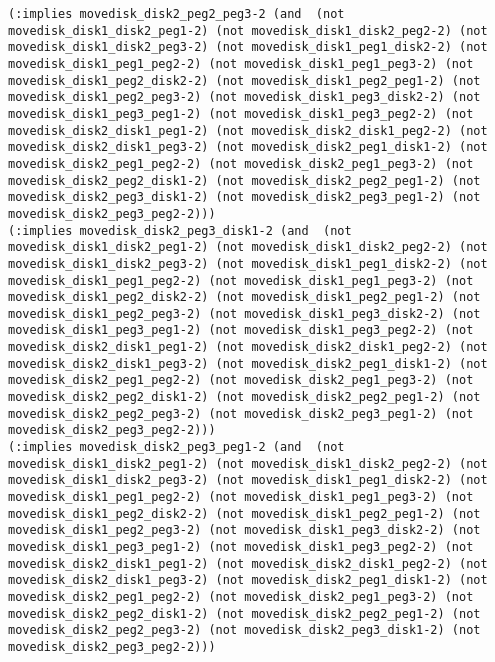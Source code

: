 \documentclass[12pt,letterpaper]{ntdhw}
\begin{document}
\begin{enumerate}
\begin{enumerate}
\begin{lstlisting}[language=pddl, style=pddlstyle,
  basicstyle=\scriptsize]
(:implies movedisk_disk2_peg2_peg3-2 (and  (not movedisk_disk1_disk2_peg1-2) (not movedisk_disk1_disk2_peg2-2) (not movedisk_disk1_disk2_peg3-2) (not movedisk_disk1_peg1_disk2-2) (not movedisk_disk1_peg1_peg2-2) (not movedisk_disk1_peg1_peg3-2) (not movedisk_disk1_peg2_disk2-2) (not movedisk_disk1_peg2_peg1-2) (not movedisk_disk1_peg2_peg3-2) (not movedisk_disk1_peg3_disk2-2) (not movedisk_disk1_peg3_peg1-2) (not movedisk_disk1_peg3_peg2-2) (not movedisk_disk2_disk1_peg1-2) (not movedisk_disk2_disk1_peg2-2) (not movedisk_disk2_disk1_peg3-2) (not movedisk_disk2_peg1_disk1-2) (not movedisk_disk2_peg1_peg2-2) (not movedisk_disk2_peg1_peg3-2) (not movedisk_disk2_peg2_disk1-2) (not movedisk_disk2_peg2_peg1-2) (not movedisk_disk2_peg3_disk1-2) (not movedisk_disk2_peg3_peg1-2) (not movedisk_disk2_peg3_peg2-2)))
(:implies movedisk_disk2_peg3_disk1-2 (and  (not movedisk_disk1_disk2_peg1-2) (not movedisk_disk1_disk2_peg2-2) (not movedisk_disk1_disk2_peg3-2) (not movedisk_disk1_peg1_disk2-2) (not movedisk_disk1_peg1_peg2-2) (not movedisk_disk1_peg1_peg3-2) (not movedisk_disk1_peg2_disk2-2) (not movedisk_disk1_peg2_peg1-2) (not movedisk_disk1_peg2_peg3-2) (not movedisk_disk1_peg3_disk2-2) (not movedisk_disk1_peg3_peg1-2) (not movedisk_disk1_peg3_peg2-2) (not movedisk_disk2_disk1_peg1-2) (not movedisk_disk2_disk1_peg2-2) (not movedisk_disk2_disk1_peg3-2) (not movedisk_disk2_peg1_disk1-2) (not movedisk_disk2_peg1_peg2-2) (not movedisk_disk2_peg1_peg3-2) (not movedisk_disk2_peg2_disk1-2) (not movedisk_disk2_peg2_peg1-2) (not movedisk_disk2_peg2_peg3-2) (not movedisk_disk2_peg3_peg1-2) (not movedisk_disk2_peg3_peg2-2)))
(:implies movedisk_disk2_peg3_peg1-2 (and  (not movedisk_disk1_disk2_peg1-2) (not movedisk_disk1_disk2_peg2-2) (not movedisk_disk1_disk2_peg3-2) (not movedisk_disk1_peg1_disk2-2) (not movedisk_disk1_peg1_peg2-2) (not movedisk_disk1_peg1_peg3-2) (not movedisk_disk1_peg2_disk2-2) (not movedisk_disk1_peg2_peg1-2) (not movedisk_disk1_peg2_peg3-2) (not movedisk_disk1_peg3_disk2-2) (not movedisk_disk1_peg3_peg1-2) (not movedisk_disk1_peg3_peg2-2) (not movedisk_disk2_disk1_peg1-2) (not movedisk_disk2_disk1_peg2-2) (not movedisk_disk2_disk1_peg3-2) (not movedisk_disk2_peg1_disk1-2) (not movedisk_disk2_peg1_peg2-2) (not movedisk_disk2_peg1_peg3-2) (not movedisk_disk2_peg2_disk1-2) (not movedisk_disk2_peg2_peg1-2) (not movedisk_disk2_peg2_peg3-2) (not movedisk_disk2_peg3_disk1-2) (not movedisk_disk2_peg3_peg2-2)))

\end{lstlisting}
\end{enumerate}
\end{enumerate}
\end{document}
